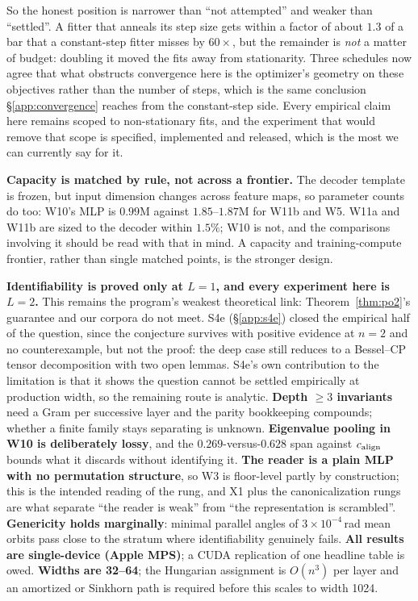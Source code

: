 So the honest position is narrower than ``not attempted'' and weaker than ``settled''. A fitter
that anneals its step size gets within a factor of about $1.3$ of a bar that a constant-step fitter
misses by $60\times$, but the remainder is \emph{not} a matter of budget: doubling it moved the
fits away from stationarity. Three schedules now agree that what obstructs convergence here is the
optimizer's geometry on these objectives rather than the number of steps, which is the same
conclusion \S\ref{app:convergence} reaches from the constant-step side. Every empirical claim here remains scoped to non-stationary
fits, and the experiment that would remove that scope is specified, implemented and released,
which is the most we can currently say for it.

\textbf{Capacity is matched by rule, not across a frontier.} The decoder template is frozen, but
input dimension changes across feature maps, so parameter counts do too: W10's MLP is $0.99$M
against $1.85$--$1.87$M for W11b and W5. W11a and W11b are sized to the decoder within $1.5\%$; W10
is not, and the comparisons involving it should be read with that in mind. A capacity and
training-compute frontier, rather than single matched points, is the stronger design.

\textbf{Identifiability is proved only at $L=1$, and every experiment here is $L=2$.} This remains
the program's weakest theoretical link: Theorem~\ref{thm:po2}'s guarantee and our corpora do not
meet. S4e (\S\ref{app:s4e}) closed the empirical half of the question, since the conjecture survives with positive evidence at $n=2$ and no counterexample, but not the proof: the deep case still
reduces to a Bessel--CP tensor decomposition with two open lemmas. S4e's own contribution to the
limitation is that it shows the question cannot be settled empirically at production width, so the
remaining route is analytic. \textbf{Depth $\ge 3$ invariants} need a Gram per successive layer and the
parity bookkeeping compounds; whether a finite family stays separating is unknown.
\textbf{Eigenvalue pooling in W10 is deliberately lossy}, and the $0.269$-versus-$0.628$ span against $c_{\mathrm{align}}$ bounds what it discards without identifying it. \textbf{The reader is a
plain MLP with no permutation structure}, so W3 is floor-level partly by construction; this is the
intended reading of the rung, and X1 plus the canonicalization rungs are what separate ``the
reader is weak'' from ``the representation is scrambled''. \textbf{Genericity holds marginally}:
minimal parallel angles of $3\times10^{-4}$\,rad mean orbits pass close to the stratum where
identifiability genuinely fails. \textbf{All results are single-device (Apple MPS)}; a CUDA
replication of one headline table is owed. \textbf{Widths are 32--64}; the Hungarian assignment is
$O(n^3)$ per layer and an amortized or Sinkhorn path is required before this scales to width 1024.

